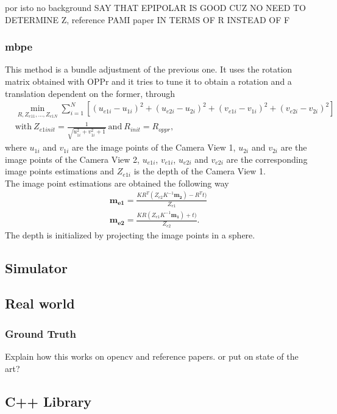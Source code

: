 por isto no background
SAY THAT EPIPOLAR IS GOOD CUZ NO NEED TO DETERMINE Z, reference PAMI paper
IN TERMS OF R INSTEAD OF F
\subsubsection{\acrlong{mbpe}}
\label{MBaPE}
This method is a bundle adjustment of the previous one. It uses the rotation matrix obtained with OPPr and it tries to tune it to obtain a rotation and a translation dependent on the former, through 
\begin{align*}
	& \min_{R, Z_{e11}, ..., Z_{e1N}} \sum^N_{i=1} [(u_{e1i}-u_{1i})^2 + (u_{e2i}-u_{2i})^2 + (v_{e1i}-v_{1i})^2 + (v_{e2i}-v_{2i})^2]\\
	& \text{with} \ Z_{e1init} = \frac{1}{\sqrt{u_{1i}^2 + v_{1i}^2 + 1}} \ \text{and} \ R_{init} = R_{oppr},
\end{align*}
where $u_{1i}$ and $v_{1i}$ are the image points of the Camera View 1, $u_{2i}$ and $v_{2i}$ are the image points of the Camera View 2, $u_{e1i}$, $v_{e1i}$, $u_{e2i}$ and $v_{e2i}$ are the corresponding image points estimations and $Z_{e1i}$ is the depth of the Camera View 1.\\
The image point estimations are obtained the following way
\begin{align*}
	\mathbf{m_{e1}} = \frac{KR^T(Z_{e2}K^{-1}\mathbf{m_2}) - R^Tt)}{Z_{e1}}\\
	\mathbf{m_{e2}} = \frac{KR(Z_{e1}K^{-1}\mathbf{m_1}) + t)}{Z_{e2}}.
\end{align*} The depth is initialized by projecting the image points in a sphere.

\subsection{Simulator}

\subsection{Real world}

\subsubsection{Ground Truth}

Explain how this works on opencv and reference papers. or put on state of the art?

\subsection{C++ Library}